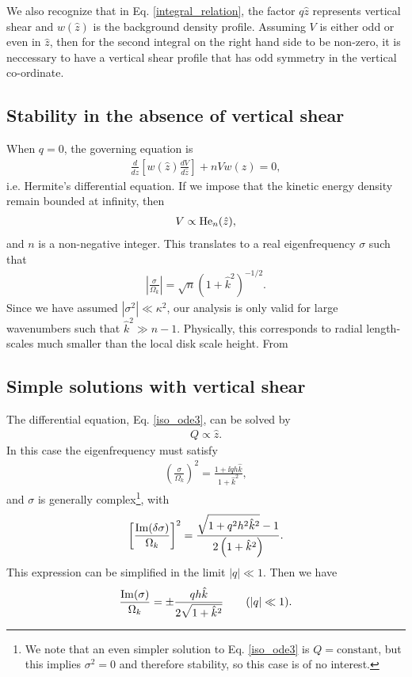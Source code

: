 We also recognize that in Eq. \ref{integral_relation}, 
the factor $q\hat{z}$ represents vertical shear and $w(\hat{z})$ is
the background density profile. Assuming $V$ is either odd or even in
$\hat{z}$,  then for the second integral on the right
hand side to be non-zero, it is neccessary to have a vertical shear
profile that has odd symmetry in the vertical co-ordinate.  

\subsection{Stability in the absence of vertical shear}
When $q=0$, the governing equation is
\begin{align}
  \frac{d}{d\hat{z}}\left[w(\hat{z})\frac{dV}{d\hat{z}}\right] + nV
  w(\hat{z}) =0, 
\end{align}
i.e. Hermite's differential equation. If we impose that the kinetic
energy density remain bounded at infinity, then  
\begin{align}
  V\propto \operatorname{He}_n(\hat{z}),
\end{align}
and $n$ is a non-negative integer. This translates to a real
eigenfrequency $\sigma$ such that
\begin{align}
  \left|\frac{\sigma}{\Omega_k}\right| = \sqrt{n}
  \left(1+\hat{k}^2\right)^{-1/2}. 
\end{align}
Since we have assumed $|\sigma^2|\ll \kappa^2$, our analysis is only
valid for large wavenumbers such that $\hat{k}^2\gg 
n-1$. Physically, this corresponds to radial length-scales much
smaller than the local disk scale height. From   

\subsection{Simple solutions with vertical shear}
The differential equation, Eq. \ref{iso_ode3}, can be solved by
\begin{align}
  Q\propto \hat{z}. 
\end{align} 
In this case the eigenfrequency must satisfy 
\begin{align}
  \left(\frac{\sigma}{\Omega_k}\right)^2 = \frac{1+\ii q h
    \hat{k}}{1+\hat{k}^2}, 
\end{align}
and $\sigma$ is generally complex\footnote{
We note that an even simpler solution to Eq. \ref{iso_ode3} is
$Q=\mathrm{constant}$, but this implies $\sigma^2=0$ and therefore
stability, so this case is of no interest.}, with  
\begin{align}
  \left[\frac{\operatorname{Im}(\delta\sigma)}{\Omega_k}\right]^2 =
  \frac{\sqrt{1+q^2h^2\hat{k}^2} - 1}{2\left(1+\hat{k}^2\right)}. 
\end{align}
This expression can be simplified in the limit $|q|\ll 1$. Then we have
\begin{align}\label{simple_growth}
  \frac{\operatorname{Im}(\sigma)}{\Omega_k} = \pm
  \frac{qh\hat{k}}{2\sqrt{1+\hat{k}^2}} \quad\quad (|q|\ll 1).  
\end{align}

